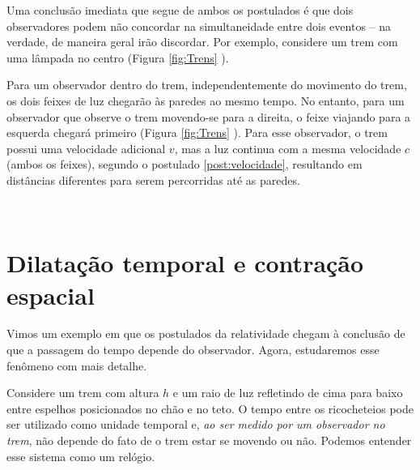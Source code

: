 Uma conclusão imediata que segue de ambos os postulados é que dois observadores podem não concordar na simultaneidade entre dois eventos -- na verdade, de maneira geral irão discordar. Por exemplo, considere um trem com uma lâmpada no centro (Figura \ref{fig:Trens} ).

Para um observador dentro do trem, independentemente do movimento do trem, os dois feixes de luz chegarão às paredes ao mesmo tempo. No entanto, para um observador que observe o trem movendo-se para a direita, o feixe viajando para a esquerda chegará primeiro (Figura \ref{fig:Trens} ). Para esse observador, o trem possui uma velocidade adicional $v$, mas a luz continua com a mesma velocidade $c$ (ambos os feixes), segundo o postulado \ref{post:velocidade}, resultando em distâncias diferentes para serem percorridas até as paredes.


\begin{figure*}[t]
    \centering
    \begin{subfigure}[t]{0.49\textwidth}
        \centering
        \caption{}
        \label{fig:trem}
    \end{subfigure}%
    ~ 
    \begin{subfigure}[t]{0.49\textwidth}
        \centering
        \caption{}
        \label{fig:TremMovimento}
    \end{subfigure}
    \caption{ {\small Feixes de luz partindo do centro de um trem para (a) um observador que anda junto ao trem e (b) para um observador que vê o trem movendo-se com velocidade $v$ para a direita.}  }
\label{fig:Trens}
\end{figure*}

\section{Dilatação temporal e contração espacial}\label{sec:DilatacaoContracao}
Vimos um exemplo em que os postulados da relatividade chegam à conclusão de que a passagem do tempo depende do observador. Agora, estudaremos esse fenômeno com mais detalhe.

Considere um trem com altura $h$ e um raio de luz refletindo de cima para baixo entre espelhos posicionados no chão e no teto. O tempo entre os ricocheteios pode ser utilizado como unidade temporal e, \textit{ao ser medido por um observador no trem}, não depende do fato de o trem estar se movendo ou não. Podemos entender esse sistema como um relógio. 

